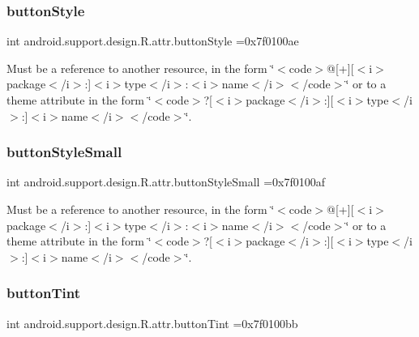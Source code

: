 \subsubsection{\texorpdfstring{button\+Style}{buttonStyle}}
{\footnotesize\ttfamily int android.\+support.\+design.\+R.\+attr.\+button\+Style =0x7f0100ae\hspace{0.3cm}{\ttfamily [static]}}

Must be a reference to another resource, in the form \char`\"{}$<$code$>$@\mbox{[}+\mbox{]}\mbox{[}$<$i$>$package$<$/i$>$\+:\mbox{]}$<$i$>$type$<$/i$>$\+:$<$i$>$name$<$/i$>$$<$/code$>$\char`\"{} or to a theme attribute in the form \char`\"{}$<$code$>$?\mbox{[}$<$i$>$package$<$/i$>$\+:\mbox{]}\mbox{[}$<$i$>$type$<$/i$>$\+:\mbox{]}$<$i$>$name$<$/i$>$$<$/code$>$\char`\"{}. \mbox{\label{classandroid_1_1support_1_1design_1_1R_1_1attr_a60fe75448db0912a195a7f3f56f3cbe3}} 
\subsubsection{\texorpdfstring{button\+Style\+Small}{buttonStyleSmall}}
{\footnotesize\ttfamily int android.\+support.\+design.\+R.\+attr.\+button\+Style\+Small =0x7f0100af\hspace{0.3cm}{\ttfamily [static]}}

Must be a reference to another resource, in the form \char`\"{}$<$code$>$@\mbox{[}+\mbox{]}\mbox{[}$<$i$>$package$<$/i$>$\+:\mbox{]}$<$i$>$type$<$/i$>$\+:$<$i$>$name$<$/i$>$$<$/code$>$\char`\"{} or to a theme attribute in the form \char`\"{}$<$code$>$?\mbox{[}$<$i$>$package$<$/i$>$\+:\mbox{]}\mbox{[}$<$i$>$type$<$/i$>$\+:\mbox{]}$<$i$>$name$<$/i$>$$<$/code$>$\char`\"{}. \mbox{\label{classandroid_1_1support_1_1design_1_1R_1_1attr_ad8dc41dd7bb0cb9f98da77fc78f0c9a2}} 
\subsubsection{\texorpdfstring{button\+Tint}{buttonTint}}
{\footnotesize\ttfamily int android.\+support.\+design.\+R.\+attr.\+button\+Tint =0x7f0100bb\hspace{0.3cm}{\ttfamily [static]}}


